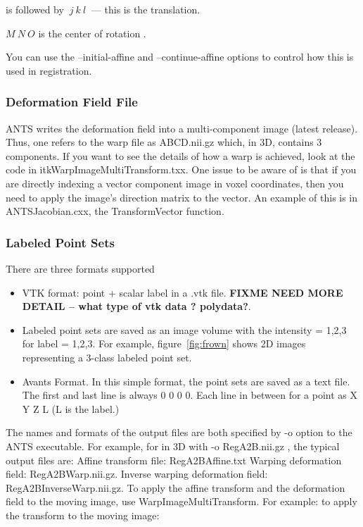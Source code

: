 \documentclass{InsightArticle}
\begin{document}
is followed by  $~j~k~l~$ --- this is the translation. 

$M~N~O$  is the center of rotation . 

You can use the --initial-affine  and    --continue-affine  options to control how this is used in registration. 

\subsubsection{Deformation Field File}
ANTS writes the deformation field into a multi-component image (latest
release).  Thus, 
one refers to the warp file as ABCD.nii.gz which, in 3D, contains 3 components.  If you want to 
see the details of how a warp is achieved, look at the code in itkWarpImageMultiTransform.txx. 
One issue to be aware of is that if you are directly indexing a vector component image in 
voxel coordinates, then you need to apply the image's direction matrix to the vector.  
An example of this is in ANTSJacobian.cxx, the TransformVector function. 

\subsubsection{Labeled Point Sets}
There are three formats supported
\begin{itemize}
\item  VTK format: point + scalar label in a .vtk file. {\bf FIXME NEED MORE DETAIL -- what type of vtk data ?  polydata?}.
\item  Labeled point sets are saved as an image volume with the intensity = 1,2,3 for label = 1,2,3. For example, 
figure~\ref{fig:frown} shows 2D images representing a 3-class labeled point set. 
\item Avants Format. In this simple format, the point sets are saved as a text file. The first and last line is always 0 0 0 0. Each line in between for a point as X Y Z L (L is the label.)
\end{itemize}
The names and formats of the output files are both specified by -o option to the ANTS executable. 
For example, for in 3D with -o RegA2B.nii.gz , the typical output files are:
Affine transform file: 
RegA2BAffine.txt 
Warping deformation field: 
RegA2BWarp.nii.gz.
Inverse warping deformation field:
RegA2BInverseWarp.nii.gz.  
To apply the affine transform and the deformation field to the moving image, use WarpImageMultiTransform. 
For example: to apply the transform to the moving image:
\end{document}

